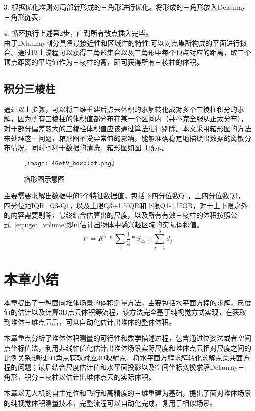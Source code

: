 3. 根据优化准则对局部新形成的三角形进行优化。将形成的三角形放入Delaunay三角形链表;

4. 循环执行上述第2步，直到所有散点插入完毕。\\
由于Delaunay剖分具备最接近性和区域性的特性,可以对点集所构成的平面进行拟合。通过以上流程可以获得三角形集合以及三角形中每个顶点对应的距离，取三个顶点距离的平均值作为三棱柱的高，即可获得所有三棱柱的体积。
\subsection{积分三棱柱}
\label{sec:4.4.4}
通过以上步骤，可以将三维重建后点云体积的求解转化成对多个三棱柱积分的求解，因为所有三棱柱的体积值都分布在某一个区间内（并不完全服从正太分布），对于部分偏差较大的三棱柱体积值应该通过算法进行剔除。本文采用箱形图的方法来处理这一问题，箱形图不受异常值的影响，能够准确稳定地描绘出数据的离散分布情况，同时也利于数据的清洗，箱形图如图~\ref{fig:4GetV_boxplot}所示。
\begin{figure}[t] %
  \centering
  \texttt{[image: 4GetV\_boxplot.png]}
  \caption{箱形图示意图}
  \label{fig:4GetV_boxplot}
\end{figure}
主要需要求解出数据中的5个特征数据值，包括下四分位数Q1，上四分位数Q3，四分位距IQR=Q3-Q1，以及上限Q3+1.5IQR和下限Q1-1.5IQR，对于上下限之外的内容需要剔除，最终结合\label{sec:4.3}估算出的尺度，以及所有有效三棱柱的体积按照公式~\ref{equ:get_volume}即可估计出物体中感兴趣区域的实际体积值。
\begin{equation}
  V\;=K^3\;\ast\sum_i\frac13\ast S_\bigtriangleup\times\sum_{j=1}^3d_j\label{equ:get_volume}
\end{equation}
\section{本章小结}
本章提出了一种面向堆体场景的体积测量方法，主要包括水平面方程的求解，尺度值的估计以及计算3D点云体积等流程，该方法完全基于纯视觉方式实现，在获取到堆体三维点云后，可以自动化估计出堆体的整体体积。

本章重点分析了堆体体积测量的可行性和数学描述过程，包含通过位姿法或者空间点坐标值法，利用非线性优化估计出堆体场景实际尺度和堆体点云相对尺度之间的比例关系;通过2D角点获取对应3D映射点，将水平面方程求解转化求解点集共面方程的问题；最后结合尺度估计值和水平面投影以及空间坐标变换求解Delaunay三角形，积分三棱柱以估计出堆体点云的实际体积。

本章以无人机的自主定位和飞行和高精度的三维重建为基础，提出了面对堆体场景的纯视觉体积测量技术，完整流程可以自动化完成，复用于相似场景。






